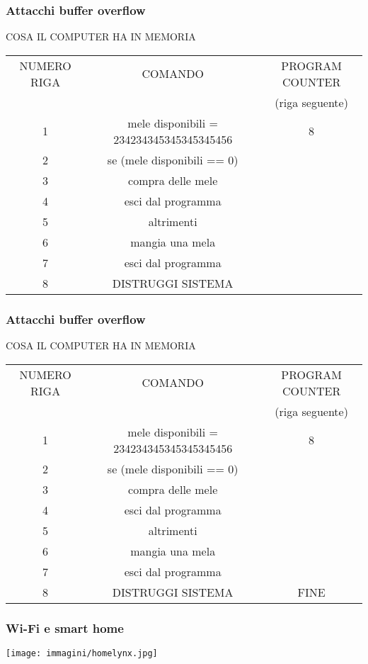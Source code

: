 \documentclass[italian,aspectratio=169]{beamer}
\begin{document}
\begin{frame}
 \frametitle{Attacchi buffer overflow}
 COSA IL COMPUTER HA IN MEMORIA
 \begin{center}
 \begin{tabular}{|c|c|c|}
\hline 
{NUMERO RIGA} & {COMANDO} & {PROGRAM COUNTER}\tabularnewline
{}&{}&{(riga seguente)}\tabularnewline
\hline 
\hline 
{1} & {mele disponibili = 234234345345345345456} & {8}\tabularnewline
\hline
{2} & {se (mele disponibili == 0)} & {}\tabularnewline
\hline
{3} & {compra delle mele} & {}\tabularnewline
\hline
{4} & {esci dal programma} & {}\tabularnewline
\hline
{5} & {altrimenti} & {}\tabularnewline
\hline
{6} & {mangia una mela} & {}\tabularnewline
\hline
{7} & {esci dal programma} & {}\tabularnewline
\hline
{8} & {DISTRUGGI SISTEMA} & {}\tabularnewline
\hline
\end{tabular}
\end{center}
\end{frame}


\begin{frame}
 \frametitle{Attacchi buffer overflow}
 COSA IL COMPUTER HA IN MEMORIA
 \begin{center}
 \begin{tabular}{|c|c|c|}
\hline 
{NUMERO RIGA} & {COMANDO} & {PROGRAM COUNTER}\tabularnewline
{}&{}&{(riga seguente)}\tabularnewline
\hline 
\hline 
{1} & {mele disponibili = 234234345345345345456} & {8}\tabularnewline
\hline
{2} & {se (mele disponibili == 0)} & {}\tabularnewline
\hline
{3} & {compra delle mele} & {}\tabularnewline
\hline
{4} & {esci dal programma} & {}\tabularnewline
\hline
{5} & {altrimenti} & {}\tabularnewline
\hline
{6} & {mangia una mela} & {}\tabularnewline
\hline
{7} & {esci dal programma} & {}\tabularnewline
\hline
{8} & {DISTRUGGI SISTEMA} & {FINE}\tabularnewline
\hline
\end{tabular}
\end{center}
\end{frame}


\begin{frame}
 \frametitle{Wi-Fi e smart home}
 \begin{center}
    \texttt{[image: immagini/homelynx.jpg]}
 \end{center}
\end{frame}
\end{document}
